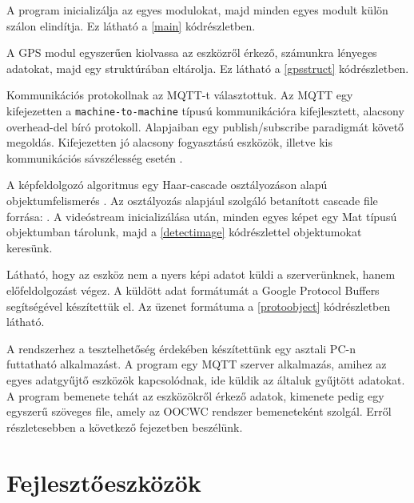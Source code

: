 \documentclass[a4paper,12pt]{report}
\begin{document}
A program inicializálja az egyes modulokat, majd minden egyes modult külön szálon elindítja. Ez látható a \ref{main} kódrészletben.



A GPS modul egyszerűen kiolvassa az eszközről érkező, számunkra lényeges adatokat, majd egy struktúrában eltárolja. Ez látható a \ref{gpsstruct} kódrészletben.



Kommunikációs protokollnak az MQTT-t választottuk. Az MQTT egy kifejezetten a \texttt{machine-to-machine} típusú kommunikációra kifejlesztett, alacsony overhead-del bíró protokoll. Alapjaiban egy publish/subscribe paradigmát követő megoldás. Kifejezetten jó alacsony fogyasztású eszközök, illetve kis kommunikációs sávszélesség esetén \cite{mqtt}. 

A képfeldolgozó algoritmus egy Haar-cascade osztályozáson alapú objektumfelismerés \cite{violacascade} \cite{haaremp}. Az osztályozás alapjául szolgáló betanított cascade file forrása: \cite{cascade}. A videóstream inicializálása után, minden egyes képet egy Mat típusú objektumban tárolunk, majd a \ref{detectimage} kódrészlettel objektumokat keresünk. 



Látható, hogy az eszköz nem a nyers képi adatot küldi a szerverünknek, hanem előfeldolgozást végez. A küldött adat formátumát a Google Protocol Buffers segítségével készítettük el. Az üzenet formátuma a \ref{protoobject} kódrészletben látható. 



A rendszerhez a tesztelhetőség érdekében készítettünk egy asztali PC-n futtatható alkalmazást. A program egy MQTT szerver alkalmazás, amihez az egyes adatgyűjtő eszközök kapcsolódnak, ide küldik az általuk gyűjtött adatokat. A program bemenete tehát az eszközökről érkező adatok, kimenete pedig egy egyszerű szöveges file, amely az OOCWC rendszer bemeneteként szolgál. Erről részletesebben a következő fejezetben beszélünk.

\section{Fejlesztőeszközök}
\label{dev}
\end{document}
